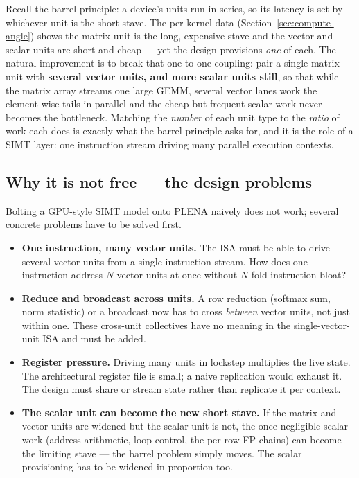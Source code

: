 \documentclass[11pt]{report}
\begin{document}
Recall the barrel principle: a device's units run in series, so its latency
is set by whichever unit is the short stave. The per-kernel data
(Section~\ref{sec:compute-angle}) shows the matrix unit is the long, expensive
stave and the vector and scalar units are short and cheap --- yet the design
provisions \emph{one} of each. The natural improvement is to break that
one-to-one coupling: pair a single matrix unit with \textbf{several vector
units, and more scalar units still}, so that while the matrix array streams
one large GEMM, several vector lanes work the element-wise tails in parallel
and the cheap-but-frequent scalar work never becomes the bottleneck. Matching
the \emph{number} of each unit type to the \emph{ratio} of work each does is
exactly what the barrel principle asks for, and it is the role of a SIMT
layer: one instruction stream driving many parallel execution contexts.

\subsection{Why it is not free --- the design problems}

Bolting a GPU-style SIMT model onto PLENA naively does not work; several
concrete problems have to be solved first.

\begin{itemize}
\item \textbf{One instruction, many vector units.} The ISA must be able to
drive several vector units from a single instruction stream. How does one
instruction address $N$ vector units at once without $N$-fold instruction
bloat?
\item \textbf{Reduce and broadcast across units.} A row reduction (softmax
sum, norm statistic) or a broadcast now has to cross \emph{between} vector
units, not just within one. These cross-unit collectives have no meaning in
the single-vector-unit ISA and must be added.
\item \textbf{Register pressure.} Driving many units in lockstep multiplies
the live state. The architectural register file is small; a naive replication
would exhaust it. The design must share or stream state rather than replicate
it per context.
\item \textbf{The scalar unit can become the new short stave.} If the
matrix and vector units are widened but the scalar unit is not, the
once-negligible scalar work (address arithmetic, loop control, the per-row
FP chains) can become the limiting stave --- the barrel problem simply moves.
The scalar provisioning has to be widened in proportion too.
\end{itemize}
\end{document}
